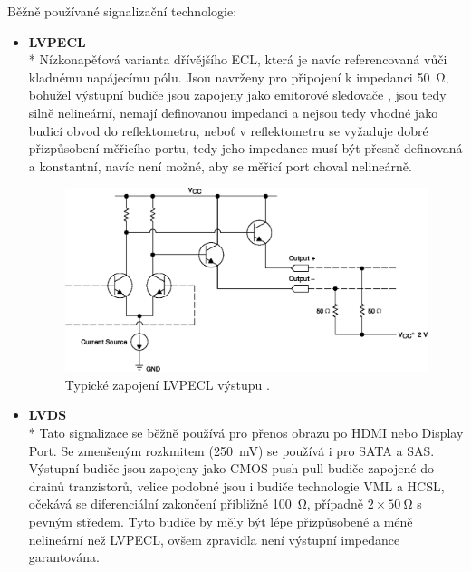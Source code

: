 Běžně používané signalizační technologie:
\begin{itemize}
	\item
	\textbf{\acrshort{LVPECL}}\\*	
		Nízkonapěťová varianta dřívějšího \acrshort{ECL}, která je navíc referencovaná vůči kladnému napájecímu pólu. Jsou navrženy pro připojení k impedanci \SI{50}{\ohm}, bohužel výstupní budiče jsou zapojeny jako emitorové sledovače \cite{lvpecl_vml_cml_lvds_interfacing}, jsou tedy silně nelineární, nemají definovanou impedanci a nejsou tedy vhodné jako budicí obvod do reflektometru, neboť v reflektometru se vyžaduje dobré přizpůsobení měřicího portu, tedy jeho impedance musí být přesně definovaná a konstantní, navíc není možné, aby se měřicí port choval nelineárně.
	
		\begin{figure}[htbp]\includegraphics[width=\textwidth,keepaspectratio]{images/lvpecl_output.eps}\caption{Typické zapojení LVPECL výstupu \cite{lvpecl_vml_cml_lvds_interfacing}.}\label{lvpecl_output}\end{figure}		
		
	\item
	\textbf{\acrshort{LVDS}}\\*
		Tato signalizace se běžně používá pro přenos obrazu po \acrshort{HDMI} nebo Display Port. Se zmenšeným rozkmitem (\SI{250}{\milli\volt}) se používá i pro \acrshort{SATA} a \acrshort{SAS}. Výstupní budiče jsou zapojeny jako \acrshort{CMOS} push-pull budiče \cite{lvpecl_vml_cml_lvds_interfacing} zapojené do drainů tranzistorů, velice podobné jsou i budiče technologie \acrshort{VML} \cite{lvpecl_vml_cml_lvds_interfacing} a \acrshort{HCSL}, očekává se diferenciální zakončení přibližně \SI{100}{\ohm}, případně $2\times\SI{50}{\ohm}$ s pevným středem. Tyto budiče by měly být lépe přizpůsobené a méně nelineární než \acrshort{LVPECL}, ovšem zpravidla není výstupní impedance garantována.
		

\end{itemize}
